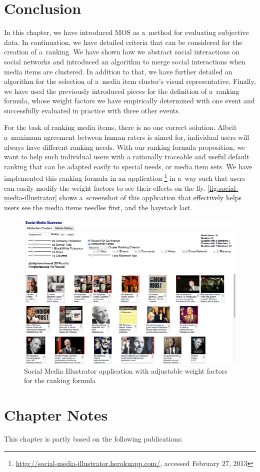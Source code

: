 \section{Conclusion}

In this chapter, we have introduced MOS as a~method
for evaluating subjective data.
In continuation, we have detailed criteria
that can be considered for the creation of a~ranking.
We have shown how we abstract social interactions on social networks
and introduced an algorithm to merge social interactions
when media items are clustered.
In addition to that, we have further detailed an algorithm
for the selection of a~media item cluster's visual representative.
Finally, we have used the previously introduced pieces
for the definition of a~ranking formula,
whose weight factors we have empirically determined with one event
and successfully evaluated in practice with three other events.

For the task of ranking media items, there is no one correct solution.
Albeit a~maximum agreement between human raters is aimed for,
individual users will always have different ranking needs.
With our ranking formula proposition, we want to help
such individual users with a rationally traceable and useful default ranking
that can be adapted easily to special needs, or media item sets.
We have implemented this ranking formula in an application%
\footnote{\url{http://social-media-illustrator.herokuapp.com/},
accessed February 27, 2013}
in a~way such that users can easily modify the weight factors
to see their effects on-the fly.
\autoref{fig:social-media-illustrator} shows a~screenshot of this application
that effectively helps users see the media items needles first, and the haystack last.

\begin{figure}[htb]
  \centering
  \includegraphics[width=1.0\linewidth]{social-media-illustrator.png}
  \caption[Social Media Illustrator application]
  {Social Media Illustrator application with adjustable weight factors
  for the ranking formula}
  \label{fig:social-media-illustrator}
\end{figure}


\section*{Chapter Notes}
This chapter is partly based on the following publications:
